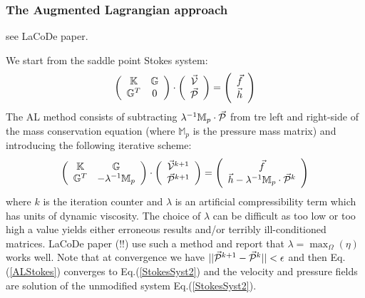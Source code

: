 \subsubsection{The Augmented Lagrangian approach}


see LaCoDe paper.

We start from the saddle point Stokes system:
\begin{equation}
\left(
\begin{array}{cc}
{\mathbb{K}} & {\mathbb{G}} \\ {\mathbb{G}}^T & 0 
\end{array}
\right)
\cdot
\left(
\begin{array}{c}
\vec{\cal V} \\ \vec{\cal P}
\end{array}
\right)
=
\left(
\begin{array}{c}
\vec{f} \\ \vec{h}
\end{array}
\right)
\label{StokesSyst2}
\end{equation}
The AL method consists of subtracting $\lambda^{-1} \mathbb{M}_p \cdot \vec{\cal P}$ from tre left and 
right-side of the mass conservation equation (where $\mathbb{M}_p$ is the pressure mass matrix) 
and introducing the following iterative scheme:
\begin{equation}
\left(
\begin{array}{cc}
{\mathbb{K}} & {\mathbb{G}} \\ {\mathbb{G}}^T & -\lambda^{-1} \mathbb{M}_p
\end{array}
\right)
\cdot
\left(
\begin{array}{c}
\vec{\cal V}^{k+1} \\ \vec{\cal P}^{k+1}
\end{array}
\right)
=
\left(
\begin{array}{c}
\vec{f} \\ \vec{h} - \lambda^{-1} \mathbb{M}_p \cdot \vec{\cal P}^k
\end{array}
\right)
\label{ALStokes}
\end{equation}
where $k$ is the iteration counter and $\lambda$ is an artificial compressibility term which has units of dynamic viscosity. 
The choice of $\lambda$ can be difficult as too low or too high a value yields either erroneous results and/or terribly ill-conditioned matrices. LaCoDe paper (!!) use such a method and report that $\lambda=\max_\Omega({\eta})$
works well. 
Note that at convergence we have $||\vec{\cal P}^{k+1}-\vec{\cal P}^k||<\epsilon$ and then Eq.(\ref{ALStokes}) converges to Eq.(\ref{StokesSyst2}) and the velocity and pressure fields are solution of the unmodified system Eq.(\ref{StokesSyst2}).

